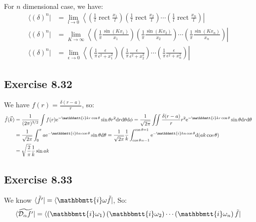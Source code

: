 \documentclass[]{ctexart}
\newcommand{\mi}{\mathbbmtt{i}}
\newcommand{\di}{\mathrm{d}}
\newcommand{\me}{\mathrm{e}}
\begin{document}
	For $n$ dimensional case, we have:
		\begin{equation*}
		\begin{aligned}
		\langle\left(\delta\right)^n|&=\lim _{l \rightarrow 0}\left\langle\left(\frac{1}{l} \operatorname{rect} \frac{x_1}{l}\right)\left(\frac{1}{l} \operatorname{rect} \frac{x_2}{l}\right)\cdots\left(\frac{1}{l} \operatorname{rect} \frac{x_n}{l}\right)\right| \\
			\langle\left(\delta\right)^n|&=\lim _{K \rightarrow \infty}\left\langle\left(\frac{1}{\pi} \frac{\sin (K x_1)}{x_1}\right)\left(\frac{1}{\pi} \frac{\sin (K x_2)}{x_2}\right)\cdots\left(\frac{1}{\pi} \frac{\sin (K x_n)}{x_n}\right)\right|\\
			\langle\left(\delta\right)^n|&=\lim _{\epsilon \rightarrow 0}\left\langle\left(\frac{1}{\pi} \frac{\epsilon}{\epsilon^{2}+x_1^{2}}\right)\left(\frac{1}{\pi} \frac{\epsilon}{\epsilon^{2}+x_2^{2}}\right)\cdots \left(\frac{1}{\pi} \frac{\epsilon}{\epsilon^{2}+x_n^{2}}\right)\right|
		\end{aligned}
		\end{equation*}
		
	\subsection{Exercise 8.32}
		We have $f(r)=\frac{\delta(r-a)}{r}$, so:
			\begin{equation*}
			\begin{aligned}
				\tilde{f}(\vec{k}) &=\frac{1}{(2 \pi)^{3 / 2}} \int f(r) \me^{-\mi k r \cos \theta} \sin \theta r^{2} \di r \di \theta \di \phi=\frac{1}{\sqrt{2 \pi}} \iint \frac{\delta(r-a)}{r} r^{2} \me^{-\mi k r \cos \theta} \sin \theta \di r \di \theta \\
				&=\frac{1}{\sqrt{2 \pi}} \int_{0}^{\pi} a \me^{-\mi k a \cos \theta} \sin \theta \di \theta=\frac{1}{\sqrt{2 \pi}} \frac{1}{k} \int_{\cos \theta=-1}^{\cos \theta=1} \me^{-\mi k a \cos \theta} \di(a k \cos \theta) \\
				&=\sqrt{\frac{2}{\pi}} \frac{1}{k} \sin a k
			\end{aligned}
			\end{equation*}
		
	\subsection{Exercise 8.33}
		We know $\langle \tilde{f'}|=\langle\mi \omega \tilde{f}|$, So:
			\begin{equation*}
			\begin{aligned}
				\langle \widetilde{\mathcal{D}_{\alpha}f'}|=\langle\left(\mi \omega_1 \right)\left(\mi \omega_2 \right)\cdots \left(\mi \omega_n \right)\tilde{f}|
			\end{aligned}
			\end{equation*}
			
\end{document}

